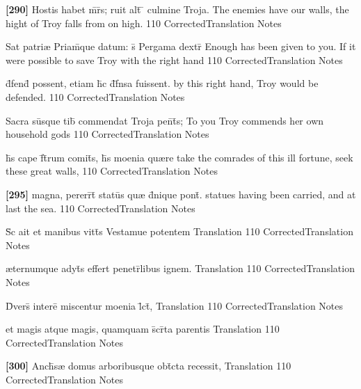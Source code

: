 \latline
  {\textbf{[290]} Hostis habet m\={}r\={}s; ruit alt\={} \={} culmine Troja.}
  { The enemies have our walls, the hight of Troy falls from on high. }
  {110}
  { CorrectedTranslation }
  { Notes }


\latline
  {Sat patri{\ae} Priam\={}que datum: s\={\macron {\i}} Pergama dextr\={}}
  { Enough has been given to you.  If it were possible to save Troy with the right hand }
  {110}
  { CorrectedTranslation }
  { Notes }


\latline
  {d\={}fend\={\macron {\i}} possent, etiam h\={}c d\={}f\={}nsa fuissent.}
  { by this right hand, Troy would be defended. }
  {110}
  { CorrectedTranslation }
  { Notes }


\latline
  {Sacra su\={}sque tib\={\macron {\i}} commendat Troja pen\={}t\={\macron {\i}}s;}
  { To you Troy commends her own household gods }
  {110}
  { CorrectedTranslation }
  { Notes }


\latline
  {h\={}s cape f\={}t\={}rum comit\={}s, h\={\macron {\i}}s moenia qu{\ae}re }
  { take the comrades of this ill fortune, seek these great walls, }
  {110}
  { CorrectedTranslation }
  { Notes }


\latline
  {\textbf{[295]} magna, pererr\={}t\={} statu\={}s qu{\ae} d\={}nique pont\={}.}
  { statues having been carried, and at last the sea. }
  {110}
  { CorrectedTranslation }
  { Notes }


\latline
  {S\={\macron {\i}}c ait et manibus vitt\={}s Vestamue potentem}
  { Translation }
  {110}
  { CorrectedTranslation }
  { Notes }


\latline
  {{\ae}ternumque adyt\={\macron {\i}}s effert penetr\={}libus ignem.}
  { Translation }
  {110}
  { CorrectedTranslation }
  { Notes }


\latline
  {D\={\macron {\i}}vers\={} intere\={} miscentur moenia l\={}ct\={},}
  { Translation }
  {110}
  { CorrectedTranslation }
  { Notes }


\latline
  {et magis atque magis, quamquam s\={}cr\={}ta parentis}
  { Translation }
  {110}
  { CorrectedTranslation }
  { Notes }


\latline
  {\textbf{[300]} Anch\={\macron {\i}}s{\ae} domus arboribusque obt\={}cta recessit,}
  { Translation }
  {110}
  { CorrectedTranslation }
  { Notes }


